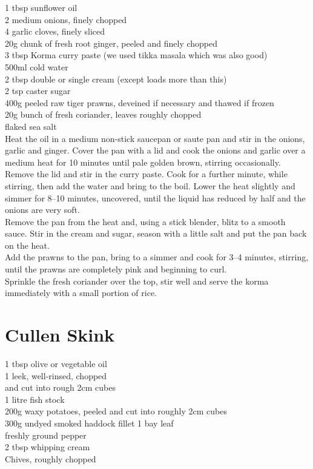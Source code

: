\documentclass[18pt, oneside]{book}
\begin{document}
1 tbsp sunflower oil \\
2 medium onions, finely chopped \\
4 garlic cloves, finely sliced \\
20g chunk of fresh root ginger, peeled and finely chopped \\
3 tbsp Korma curry paste (we used tikka masala which was also good) \\
500ml cold water \\
2 tbsp double or single cream (except loads more than this)\\
2 tsp caster sugar \\
400g peeled raw tiger prawns, deveined if necessary and thawed if frozen \\
20g bunch of fresh coriander, leaves roughly chopped \\
flaked sea salt \\


Heat the oil in a medium non-stick saucepan or saute pan and stir in the onions, garlic and ginger. Cover the pan with a lid and cook the onions and garlic over a medium heat for 10 minutes until pale golden brown, stirring occasionally. \\

Remove the lid and stir in the curry paste. Cook for a further minute, while stirring, then add the water and bring to the boil. Lower the heat slightly and simmer for 8–10 minutes, uncovered, until the liquid has reduced by half and the onions are very soft. \\

Remove the pan from the heat and, using a stick blender, blitz to a smooth sauce. Stir in the cream and sugar, season with a little salt and put the pan back on the heat. \\

Add the prawns to the pan, bring to a simmer and cook for 3–4 minutes, stirring, until the prawns are completely pink and beginning to curl. \\

Sprinkle the fresh coriander over the top, stir well and serve the korma immediately with a small portion of rice. \\

\section{Cullen Skink}
1 tbsp olive or vegetable oil \\
1 leek, well-rinsed, chopped \\
and cut into rough 2cm cubes \\
1 litre fish stock \\
200g waxy potatoes, peeled and cut into roughly 2cm cubes \\
300g undyed smoked haddock fillet 1 bay leaf \\
freshly ground pepper \\
2 tbsp whipping cream \\
Chives, roughly chopped \\
\end{document}
